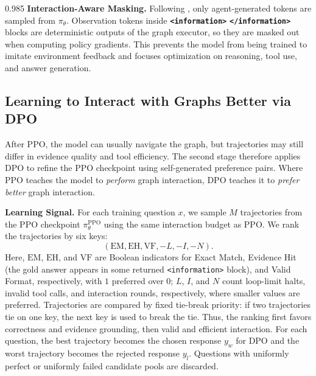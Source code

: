 \documentclass[11pt]{article}
\begin{document}
\begin{spacing}{0.985}
\smallskip
\noindent\textbf{Interaction-Aware Masking.}
Following \citet{jin2025search}, only agent-generated tokens are sampled from $\pi_\theta$.
Observation tokens inside \textbf{\texttt{<information>}} \textbf{\texttt{</information>}} blocks are deterministic outputs of the graph executor, so they are masked out when computing policy gradients.
This prevents the model from being trained to imitate environment feedback and focuses optimization on reasoning, tool use, and answer generation.

\subsection{Learning to Interact with Graphs Better via DPO}
\label{sec:dpo}

After PPO, the model can usually navigate the graph, but trajectories may still differ in evidence quality and tool efficiency.
The second stage therefore applies DPO \cite{rafailov2023direct} to refine the PPO checkpoint using self-generated preference pairs.
Where PPO teaches the model to \emph{perform} graph interaction, DPO teaches it to \emph{prefer better} graph interaction.

\smallskip
\noindent\textbf{Learning Signal.}
For each training question $x$, we sample $M$ trajectories from the PPO checkpoint $\pi^{\mathrm{PPO}}_\theta$ using the same interaction budget as PPO.
We rank the trajectories by six keys:
\begin{equation*}
(\mathrm{EM}, \mathrm{EH}, \mathrm{VF}, -L, -I, -N).
\end{equation*}
Here, $\mathrm{EM}$, $\mathrm{EH}$, and $\mathrm{VF}$ are Boolean indicators for Exact Match, Evidence Hit (the gold answer appears in some returned \texttt{<information>} block), and Valid Format, respectively, with $1$ preferred over $0$;
$L$, $I$, and $N$ count loop-limit halts, invalid tool calls, and interaction rounds, respectively, where smaller values are preferred.
Trajectories are compared by fixed tie-break priority: if two trajectories tie on one key, the next key is used to break the tie.
Thus, the ranking first favors correctness and evidence grounding, then valid and efficient interaction.
For each question, the best trajectory becomes the chosen response $y_w$ for DPO and the worst trajectory becomes the rejected response $y_l$. Questions with uniformly perfect or uniformly failed candidate pools are discarded.


\end{spacing}
\end{document}
